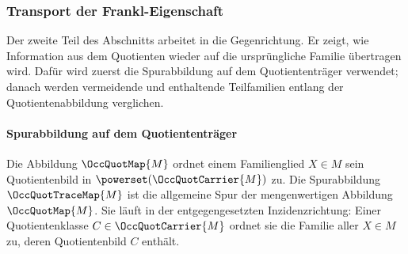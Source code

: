 \documentclass[main.tex]{subfiles}
\begin{document}
\begin{tabproof}
\end{tabproof}

\subsubsection{Transport der Frankl-Eigenschaft}

Der zweite Teil des Abschnitts arbeitet in die Gegenrichtung. Er zeigt, wie
Information aus dem Quotienten wieder auf die ursprüngliche Familie übertragen
wird. Dafür wird zuerst die Spurabbildung auf dem Quotiententräger verwendet;
danach werden vermeidende und enthaltende Teilfamilien entlang der
Quotientenabbildung verglichen.

\paragraph{Spurabbildung auf dem Quotiententräger}

Die Abbildung \(\OccQuotMap{M}\) ordnet einem Familienglied \(X\in M\)
sein Quotientenbild in \(\powerset(\OccQuotCarrier{M})\) zu. Die
Spurabbildung \(\OccQuotTraceMap{M}\) ist die allgemeine Spur der
mengenwertigen Abbildung \(\OccQuotMap{M}\). Sie läuft in der
entgegengesetzten Inzidenzrichtung: Einer Quotientenklasse
\(C\in\OccQuotCarrier{M}\) ordnet sie die Familie aller \(X\in M\) zu,
deren Quotientenbild \(C\) enthält.

\end{document}
